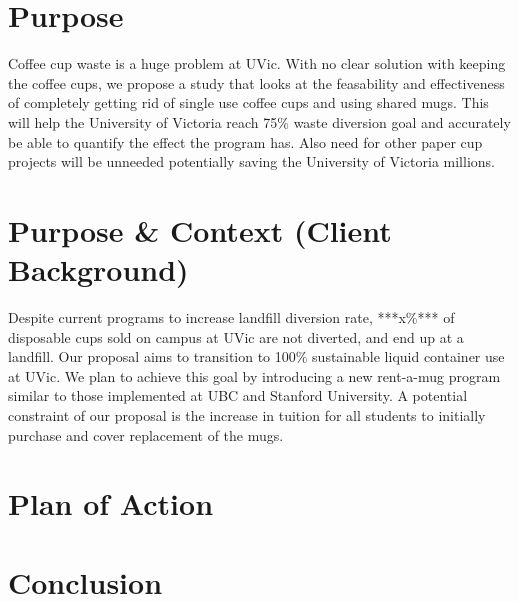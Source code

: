\documentclass[letterpaper,11pt]{texMemo} %
\begin{document}
\maketitle %


\section*{Purpose}
Coffee cup waste is a huge problem at UVic. With no clear solution with keeping the coffee cups, we
propose a study that looks at the feasability and effectiveness of completely getting rid of single
use coffee cups and using shared mugs. This will help the University of Victoria reach 75\% waste 
diversion goal and accurately be able to quantify the effect the program has. Also need for other 
paper cup projects will be unneeded potentially saving the University of Victoria millions.
\section*{Purpose & Context (Client Background)}
Despite current programs to increase landfill diversion rate, ***x\%*** of
disposable cups sold on campus at UVic are not diverted, and end up at a landfill.
Our proposal aims to transition to 100\% sustainable liquid container use at UVic.
We plan to achieve this goal by introducing a new rent-a-mug program similar to
those implemented at UBC and Stanford University. A potential constraint of
our proposal is the increase in tuition for all students to initially purchase
and cover replacement of the mugs.

\section*{Plan of Action}

\section*{Conclusion}

\end{document}
